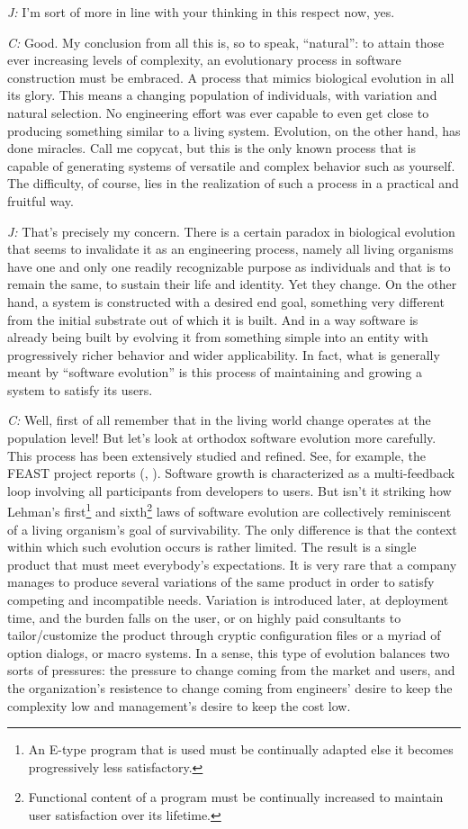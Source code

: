 \documentclass[10pt]{sigplanconf}
\begin{document}
\emph{J:} I'm sort of more in line with your thinking in this respect now, yes.

\emph{C:} Good. My conclusion from all this is, so to speak, ``natural'': to attain those ever increasing levels of complexity, an evolutionary process in software construction must be embraced. A process that mimics biological evolution in all its glory. This means a changing population of individuals, with variation and natural selection. No engineering effort was ever capable to even get close to producing something similar to a living system. Evolution, on the other hand, has done miracles. Call me copycat, but this is the only known process that is capable of generating systems of versatile and complex behavior such as yourself. The difficulty, of course, lies in the realization of such a process in a practical and fruitful way.

\emph{J:} That's precisely my concern. There is a certain paradox in biological evolution that seems to invalidate it as an engineering process, namely all living organisms have one and only one readily recognizable purpose as individuals and that is to remain the same, to sustain their life and identity. Yet they change. On the other hand, a system is constructed with a desired end goal, something very different from the initial substrate out of which it is built. And in a way software is already being built by evolving it from something simple into an entity with progressively richer behavior and wider applicability. In fact, what is generally meant by ``software evolution'' is this process of maintaining and growing a system to satisfy its users.

\emph{C:} Well, first of all remember that in the living world change operates at the population level! But let's look at orthodox software evolution more carefully. This process has been extensively studied and refined. See, for example, the FEAST project reports (\cite{lehman1}, \cite{lehman2}). Software growth is characterized as a multi-feedback loop involving all participants from developers to users. But isn't it striking how Lehman's first\footnote{An E-type program that is used must be continually adapted else it becomes progressively less satisfactory.} and sixth\footnote{Functional content of a program must be continually increased to maintain user satisfaction
over its lifetime.} laws of software evolution are collectively reminiscent of a living organism's goal of survivability. The only difference is that the context within which such evolution occurs is rather limited. The result is a single product that must meet everybody's expectations. It is very rare that a company manages to produce several variations of the same product in order to satisfy competing and incompatible needs. Variation is introduced later, at deployment time, and the burden falls on the user, or on highly paid consultants to tailor/customize the product through cryptic configuration files or a myriad of option dialogs, or macro systems. In a sense, this type of evolution balances two sorts of pressures: the pressure to change coming from the market and users, and the organization's resistence to change coming from engineers' desire to keep the complexity low and management's desire to keep the cost low.
\end{document}

